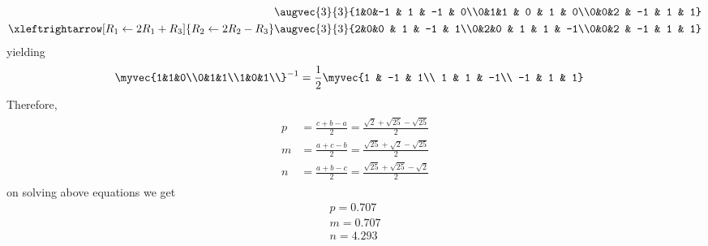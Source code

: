 \documentclass[11pt]{book}
\begin{document}
\begin{enumerate}[label=\thesection.\arabic*.,ref=\thesection.\theenumi]
\begin{align}
			\augvec{3}{3}{1&0&-1 & 1 & -1 & 0\\0&1&1 & 0 & 1 & 0\\0&0&2 & -1 & 1 & 1} \\
			\xleftrightarrow[R_1 \leftarrow 2R_1 + R_3]{R_2 \leftarrow 2R_2 - R_3}
			\augvec{3}{3}{2&0&0 & 1 & -1 & 1\\0&2&0 & 1 & 1 & -1\\0&0&2 & -1 & 1 & 1}
\end{align}
yielding
\begin{align}
			\myvec{1&1&0\\0&1&1\\1&0&1\\}^{-1} &= 
			\frac{1}{2}\myvec{1 & -1 & 1\\ 1 & 1 & -1\\ -1 & 1 & 1}
	\end{align}
	Therefore,
\begin{align}
\begin{split}
    p&=\frac{c+b-a}{2}
    =\frac{\sqrt{2}+\sqrt{25}-\sqrt{25}}{2}
    \\
    m&=\frac{a+c-b}{2}
    =\frac{\sqrt{25}+\sqrt{2}-\sqrt{25}}{2}
    \\
    n&=\frac{a+b-c}{2}
    =\frac{\sqrt{25}+\sqrt{25}-\sqrt{2}}{2}
\end{split}
\label{eq:incircle-mnp}
\end{align}
on solving above equations we get
\begin{align}
    p=0.707 \\
    m=0.707 \\
    n=4.293
\end{align}
 

\end{enumerate}
\end{document}
